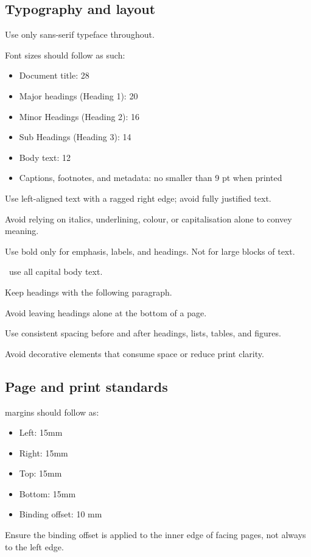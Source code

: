 \subsection{Typography and layout}

Use only sans-serif typeface throughout.

Font sizes should follow as such:
\begin{itemize}
    \item Document title: 28
    \item Major headings (Heading 1): 20
    \item Minor Headings (Heading 2): 16
    \item Sub Headings (Heading 3): 14
    \item Body text: 12
    \item Captions, footnotes, and metadata: no smaller than 9 pt when printed
\end{itemize}

Use left-aligned text with a ragged right edge; avoid fully justified text.

Avoid relying on italics, underlining, colour, or capitalisation alone to convey meaning.

Use bold only for emphasis, labels, and headings. Not for large blocks of text.

\donot~use all capital body text.

Keep headings with the following paragraph.

Avoid leaving headings alone at the bottom of a page.

Use consistent spacing before and after headings, lists, tables, and figures.

Avoid decorative elements that consume space or reduce print clarity.

\subsection{Page and print standards}

margins should follow as:
\begin{itemize}
    \item Left: 15mm
    \item Right: 15mm
    \item Top: 15mm
    \item Bottom: 15mm
    \item Binding offset: 10 mm
\end{itemize}

Ensure the binding offset is applied to the inner edge of facing pages, not always to the left edge.

